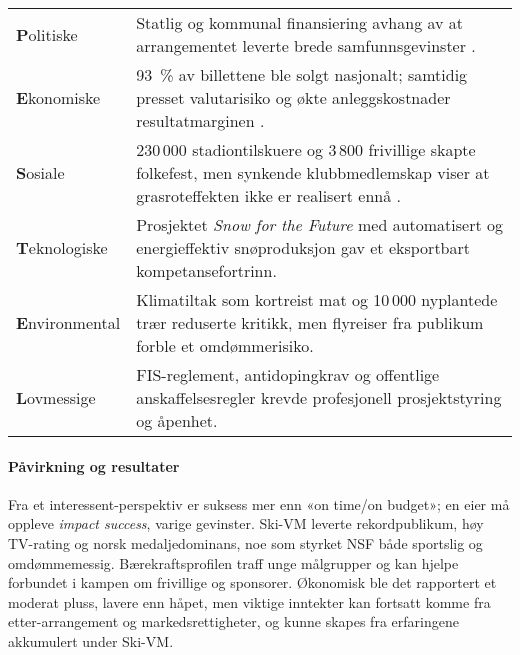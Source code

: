 \begin{table}[H]
    \centering
    \begin{tabular}{@{}p{2.7cm}p{10.2cm}@{}}
        \toprule                                                                                                                                                                                            \\ \midrule
        \textbf{P}olitiske     & Statlig og kommunal finansiering avhang av at arrangementet leverte brede samfunnsgevinster \cite{TrondheimKommuneVM}.                                                     \\
        \textbf{E}konomiske    & 93~\% av billettene ble solgt nasjonalt; samtidig presset valutarisiko og økte anleggskostnader resultatmarginen \cite{AdressaKjopefest}.                                  \\
        \textbf{S}osiale       & 230\,000 stadiontilskuere og 3\,800 frivillige skapte folkefest, men synkende klubbmedlemskap viser at grasroteffekten ikke er realisert ennå \cite{Adresseavisen,OsloVM}. \\
        \textbf{T}eknologiske  & Prosjektet \textit{Snow for the Future} med automatisert og energieffektiv snøproduksjon gav et eksportbart kompetansefortrinn\cite{Trondheim2025Sustainability}.          \\
        \textbf{E}nvironmental & Klimatiltak som kortreist mat og 10\,000 nyplantede trær reduserte kritikk, men flyreiser fra publikum forble et omdømmerisiko.                                            \\
        \textbf{L}ovmessige    & FIS-reglement, antidopingkrav og offentlige anskaffelsesregler krevde profesjonell prosjektstyring og åpenhet.                                                             \\ \bottomrule
    \end{tabular}
\end{table}

\paragraph{Påvirkning og resultater}
Fra et interessent-perspektiv er suksess mer enn «on time/on budget»; en eier må
oppleve \textit{impact success}, varige gevinster. Ski-VM leverte rekordpublikum, høy TV-rating
og norsk medaljedominans, noe som styrket NSF både sportslig og omdømmemessig.
Bærekraftsprofilen traff unge målgrupper og kan hjelpe forbundet i kampen om frivillige og sponsorer.
Økonomisk ble det rapportert et moderat pluss, lavere enn håpet, men viktige inntekter kan
fortsatt komme fra etter-arrangement og markedsrettigheter, og kunne skapes fra erfaringene akkumulert under Ski-VM\cite{Trondheim2025Portal,Adresseavisen}.

